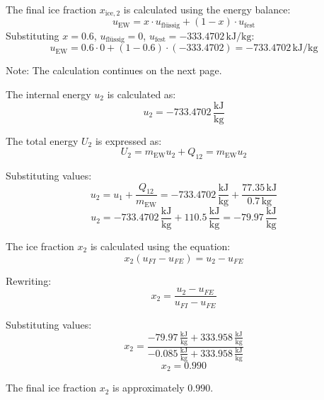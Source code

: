 The final ice fraction \( x_{\text{ice},2} \) is calculated using the energy balance:  
\[
u_{\text{EW}} = x \cdot u_{\text{flüssig}} + (1 - x) \cdot u_{\text{fest}}
\]  
Substituting \( x = 0.6 \), \( u_{\text{flüssig}} = 0 \), \( u_{\text{fest}} = -333.4702 \, \text{kJ/kg} \):  
\[
u_{\text{EW}} = 0.6 \cdot 0 + (1 - 0.6) \cdot (-333.4702) = -733.4702 \, \text{kJ/kg}
\]  

Note: The calculation continues on the next page.

The internal energy \( u_2 \) is calculated as:  
\[
u_2 = -733.4702 \, \frac{\text{kJ}}{\text{kg}}
\]  

The total energy \( U_2 \) is expressed as:  
\[
U_2 = m_{\text{EW}} u_2 + Q_{12} = m_{\text{EW}} u_2
\]  

Substituting values:  
\[
u_2 = u_1 + \frac{Q_{12}}{m_{\text{EW}}} = -733.4702 \, \frac{\text{kJ}}{\text{kg}} + \frac{77.35 \, \text{kJ}}{0.7 \, \text{kg}}
\]  
\[
u_2 = -733.4702 \, \frac{\text{kJ}}{\text{kg}} + 110.5 \, \frac{\text{kJ}}{\text{kg}} = -79.97 \, \frac{\text{kJ}}{\text{kg}}
\]  

The ice fraction \( x_2 \) is calculated using the equation:  
\[
x_2 (u_{FI} - u_{FE}) = u_2 - u_{FE}
\]  

Rewriting:  
\[
x_2 = \frac{u_2 - u_{FE}}{u_{FI} - u_{FE}}
\]  

Substituting values:  
\[
x_2 = \frac{-79.97 \, \frac{\text{kJ}}{\text{kg}} + 333.958 \, \frac{\text{kJ}}{\text{kg}}}{-0.085 \, \frac{\text{kJ}}{\text{kg}} + 333.958 \, \frac{\text{kJ}}{\text{kg}}}
\]  
\[
x_2 = 0.990
\]  

The final ice fraction \( x_2 \) is approximately \( 0.990 \).